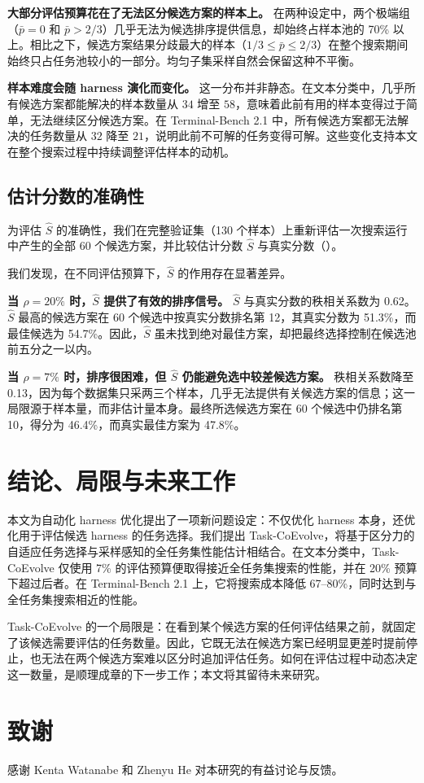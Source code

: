 \documentclass{article}
\begin{document}
\textbf{大部分评估预算花在了无法区分候选方案的样本上。}
在两种设定中，两个极端组（$\bar{p}=0$ 和 $\bar{p}>2/3$）几乎无法为候选排序提供信息，却始终占样本池的 70\% 以上。相比之下，候选方案结果分歧最大的样本（$1/3 \leq \bar{p} \leq 2/3$）在整个搜索期间始终只占任务池较小的一部分。均匀子集采样自然会保留这种不平衡。

\textbf{样本难度会随 harness 演化而变化。}
这一分布并非静态。在文本分类中，几乎所有候选方案都能解决的样本数量从 $34$ 增至 $58$，意味着此前有用的样本变得过于简单，无法继续区分候选方案。在 Terminal-Bench 2.1 中，所有候选方案都无法解决的任务数量从 $32$ 降至 $21$，说明此前不可解的任务变得可解。这些变化支持本文在整个搜索过程中持续调整评估样本的动机。

\subsection{估计分数的准确性}
为评估 $\hat{S}$ 的准确性，我们在完整验证集（130 个样本）上重新评估一次搜索运行中产生的全部 60 个候选方案，并比较估计分数 $\hat{S}$ 与真实分数（）。

我们发现，在不同评估预算下，$\hat{S}$ 的作用存在显著差异。


\textbf{当 $\rho=20\%$ 时，$\hat{S}$ 提供了有效的排序信号。}
$\hat{S}$ 与真实分数的秩相关系数为 0.62。$\hat{S}$ 最高的候选方案在 60 个候选中按真实分数排名第 12，其真实分数为 51.3\%，而最佳候选为 54.7\%。因此，$\hat{S}$ 虽未找到绝对最佳方案，却把最终选择控制在候选池前五分之一以内。

\textbf{当 $\rho=7\%$ 时，排序很困难，但 $\hat{S}$ 仍能避免选中较差候选方案。}
秩相关系数降至 0.13，因为每个数据集只采两三个样本，几乎无法提供有关候选方案的信息；这一局限源于样本量，而非估计量本身。最终所选候选方案在 60 个候选中仍排名第 10，得分为 46.4\%，而真实最佳方案为 47.8\%。

\section{结论、局限与未来工作}

本文为自动化 harness 优化提出了一项新问题设定：不仅优化 harness 本身，还优化用于评估候选 harness 的任务选择。我们提出 Task-CoEvolve，将基于区分力的自适应任务选择与采样感知的全任务集性能估计相结合。在文本分类中，Task-CoEvolve 仅使用 7\% 的评估预算便取得接近全任务集搜索的性能，并在 20\% 预算下超过后者。在 Terminal-Bench 2.1 上，它将搜索成本降低 67--80\%，同时达到与全任务集搜索相近的性能。

Task-CoEvolve 的一个局限是：在看到某个候选方案的任何评估结果之前，就固定了该候选需要评估的任务数量。因此，它既无法在候选方案已经明显更差时提前停止，也无法在两个候选方案难以区分时追加评估任务。如何在评估过程中动态决定这一数量，是顺理成章的下一步工作；本文将其留待未来研究。

\section*{致谢}
感谢 Kenta Watanabe 和 Zhenyu He 对本研究的有益讨论与反馈。



\end{document}
